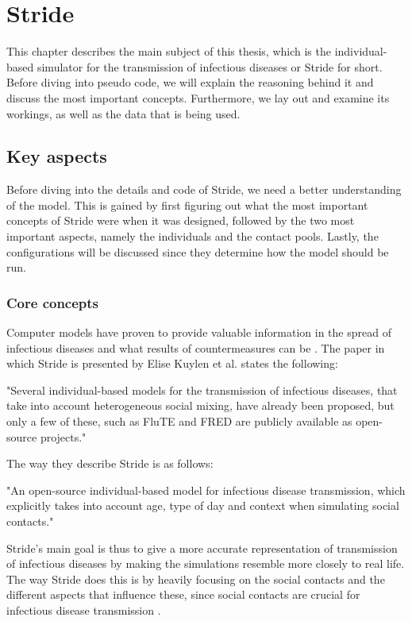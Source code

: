 \chapter{Stride}
\label{chapter:stride}
This chapter describes the main subject of this thesis, which is the individual-based simulator for the transmission of infectious diseases or Stride for short. Before diving into pseudo code, we will explain the reasoning behind it and discuss the most important concepts. Furthermore, we lay out and examine its workings, as well as the data that is being used.

\section{Key aspects}
Before diving into the details and code of Stride, we need a better understanding of the model. This is gained by first figuring out what the most important concepts of Stride were when it was designed, followed by the two most important aspects, namely the individuals and the contact pools. Lastly, the configurations will be discussed since they determine how the model should be run.

\subsection{Core concepts}
Computer models have proven to provide valuable information in the spread of infectious diseases and what results of countermeasures can be \cite{modelling_importance}. The paper in which Stride is presented by Elise Kuylen et al. \cite{stride} states the following:
\begin{quoting}
"Several individual-based models for the transmission of infectious diseases, that take into account heterogeneous social mixing, have already been proposed, but only a few of these, such as FluTE \cite{flute} and FRED \cite{fred} are publicly available as open-source projects."
\end{quoting}
The way they describe Stride is as follows:
\begin{quoting}
"An open-source individual-based model for infectious disease transmission, which explicitly takes into account age, type of day and context when simulating social contacts."
\end{quoting}
Stride's main goal is thus to give a more accurate representation of transmission of infectious diseases by making the simulations resemble more closely to real life. The way Stride does this is by heavily focusing on the social contacts and the different aspects that influence these, since social contacts are crucial for infectious disease transmission \cite{stride}.

